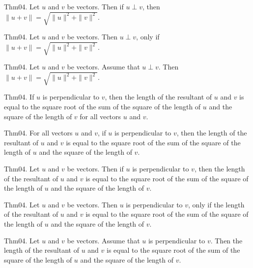 \documentclass{article}
\begin{document}
Thm04. Let $u$ and $v$ be vectors. Then if $u \perp v$, then $\| u + v \| = \sqrt{ \| u \| ^{ 2}+ \| v \| ^{ 2}}$.

Thm04. Let $u$ and $v$ be vectors. Then $u \perp v$, only if $\| u + v \| = \sqrt{ \| u \| ^{ 2}+ \| v \| ^{ 2}}$.

Thm04. Let $u$ and $v$ be vectors. Assume that $u \perp v$. Then $\| u + v \| = \sqrt{ \| u \| ^{ 2}+ \| v \| ^{ 2}}$.

Thm04. If $u$ is perpendicular to $v$, then the length of the resultant of $u$ and $v$ is equal to the square root of the sum of the square of the length of $u$ and the square of the length of $v$ for all vectors $u$ and $v$.

Thm04. For all vectors $u$ and $v$, if $u$ is perpendicular to $v$, then the length of the resultant of $u$ and $v$ is equal to the square root of the sum of the square of the length of $u$ and the square of the length of $v$.

Thm04. Let $u$ and $v$ be vectors. Then if $u$ is perpendicular to $v$, then the length of the resultant of $u$ and $v$ is equal to the square root of the sum of the square of the length of $u$ and the square of the length of $v$.

Thm04. Let $u$ and $v$ be vectors. Then $u$ is perpendicular to $v$, only if the length of the resultant of $u$ and $v$ is equal to the square root of the sum of the square of the length of $u$ and the square of the length of $v$.

Thm04. Let $u$ and $v$ be vectors. Assume that $u$ is perpendicular to $v$. Then the length of the resultant of $u$ and $v$ is equal to the square root of the sum of the square of the length of $u$ and the square of the length of $v$.
\end{document}
